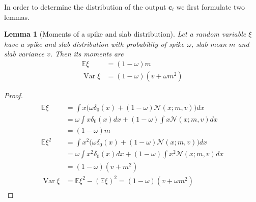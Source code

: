\documentclass[letterpaper]{article}
\newtheorem{lemma}{Lemma}
\begin{document}
In order to determine the distribution of the output $\mathbf{c}_l$ we first formulate two lemmas.

\begin{lemma}[Moments of a spike and slab distribution]
\label{thm:moments_spsl}
Let a random variable $\xi$ have a spike and slab distribution with probability of spike $\omega$, slab mean $m$ and slab variance $v$. Then its moments are
\begin{subequations}
\begin{align}
\mathbb{E}\xi &= (1-\omega)m \\
\operatorname{Var}\xi & = (1-\omega)(v + \omega m^2)
\end{align}
\end{subequations}
\end{lemma}

\begin{proof}
\begin{align*}
\begin{split}
\mathbb{E}\xi &= \int x \big(\omega \delta_0(x) + (1 - \omega)\mathcal{N}(x; m, v)\big)dx \\
& = \omega \int x \delta_0(x)dx + (1 - \omega)\int x \mathcal{N}(x; m, v)dx \\
& = (1-\omega)m \\
\mathbb{E}\xi^2 &= \int x^2 \big(\omega \delta_0(x) + (1 - \omega)\mathcal{N}(x; m, v)\big)dx \\
& = \omega \int x^2 \delta_0(x)dx + (1 - \omega)\int x^2 \mathcal{N}(x; m, v)dx \\
& = (1-\omega)(v + m^2) \\
\operatorname{Var}\xi &= \mathbb{E}\xi^2 - \left(\mathbb{E}\xi\right)^2 = (1-\omega)(v + \omega m^2)
\end{split}
\end{align*}
\end{proof}
\end{document}
